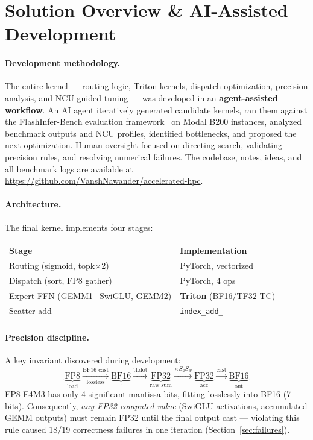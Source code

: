 \section{Solution Overview \& AI-Assisted Development}
\label{sec:overview}

\paragraph{Development methodology.}
The entire kernel --- routing logic, Triton kernels, dispatch optimization, precision analysis, and NCU-guided tuning --- was developed in an \textbf{agent-assisted workflow}.
An AI agent iteratively generated candidate kernels, ran them against the FlashInfer-Bench evaluation framework~\cite{flashinfer} on Modal B200 instances, analyzed benchmark outputs and NCU profiles, identified bottlenecks, and proposed the next optimization.
Human oversight focused on directing search, validating precision rules, and resolving numerical failures.
The codebase, notes, ideas, and all benchmark logs are available at \url{https://github.com/VanshNawander/accelerated-hpc}.

\paragraph{Architecture.}
The final kernel implements four stages:

\begin{center}\small\setlength{\tabcolsep}{4pt}
\begin{tabular}{@{}p{3.2cm}p{3.4cm}@{}}
\toprule
\textbf{Stage} & \textbf{Implementation} \\
\midrule
Routing (sigmoid, topk$\times$2) & PyTorch, vectorized \\
Dispatch (sort, FP8 gather)       & PyTorch, 4 ops \\
Expert FFN (GEMM1+SwiGLU, GEMM2) & \textbf{Triton} (BF16/TF32 TC) \\
Scatter-add                       & \texttt{index\_add\_} \\
\bottomrule
\end{tabular}
\end{center}

\paragraph{Precision discipline.}
A key invariant discovered during development:
\[
  \underbrace{\mathrm{FP8}}_{\text{load}}
  \xrightarrow[\text{lossless}]{\text{BF16 cast}}
  \underbrace{\mathrm{BF16}}_{\cdot}
  \xrightarrow{\mathrm{tl.dot}}
  \underbrace{\mathrm{FP32}}_{\text{raw sum}}
  \xrightarrow{\times S_a S_w}
  \underbrace{\mathrm{FP32}}_{\text{acc}}
  \xrightarrow{\text{cast}}
  \underbrace{\mathrm{BF16}}_{\text{out}}
\]
FP8 E4M3 has only 4 significant mantissa bits, fitting losslessly into BF16 (7 bits).
Consequently, \emph{any FP32-computed value} (SwiGLU activations, accumulated GEMM outputs) must remain FP32 until the final output cast --- violating this rule caused 18/19 correctness failures in one iteration (Section~\ref{sec:failures}).

